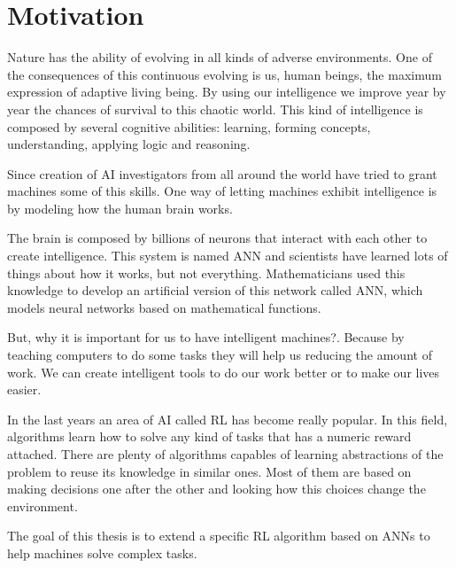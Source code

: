 \chapter{Motivation}
Nature has the ability of evolving in all kinds of adverse environments.
One of the consequences of this continuous evolving is us, human beings,
the maximum expression of adaptive living being.
By using our intelligence we improve year by year the chances of survival
to this chaotic world.
This kind of intelligence is composed by several cognitive abilities: learning,
forming concepts, understanding, applying logic and reasoning.

Since creation of \acf{AI} investigators from all around
the world have tried to grant machines some of this skills.
One way of letting machines exhibit intelligence is by modeling how the human brain works.

The brain is composed by billions of neurons that interact with each other to create intelligence.
This system is named \acf{ANN} and scientists have learned lots of things about how it works,
but not everything.
Mathematicians used this knowledge to develop an artificial version of this network called
\acf{ANN}, which models neural networks based on mathematical functions.

But, why it is important for us to have intelligent machines?.
Because by teaching computers to do some tasks they will help us reducing the amount of work.
We can create intelligent tools to do our work better or to make our lives easier.

In the last years an area of \ac{AI} called \acf{RL} has become really popular.
In this field, algorithms learn how to solve any kind of tasks that has a numeric reward attached.
There are plenty of algorithms capables of learning abstractions of the problem to reuse its knowledge in similar ones.
Most of them are based on making decisions one after the other and looking how this choices change the environment.

The goal of this thesis is to extend a specific \ac{RL} algorithm based on \acp{ANN} to help machines solve complex tasks.

